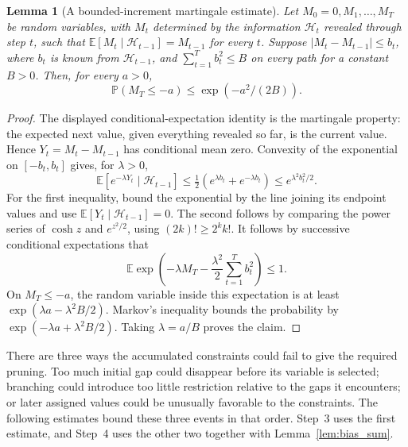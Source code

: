\documentclass[11pt,a4paper]{article}
\newtheorem{lemma}[theorem]{Lemma}
\theoremstyle{definition}
\theoremstyle{remark}
\newcommand{\E}{\mathbb E}
\newcommand{\Prb}{\mathbb P}
\begin{document}
\begin{lemma}[A bounded-increment martingale estimate]\label{lem:martingale_tail}
Let $M_0=0,M_1,\ldots,M_T$ be random variables, with $M_t$ determined
by the information $\mathcal H_t$ revealed through step $t$, such that
$\E[M_t\mid\mathcal H_{t-1}]=M_{t-1}$ for every $t$.
Suppose $|M_t-M_{t-1}|\le b_t$, where $b_t$ is known from
$\mathcal H_{t-1}$, and $\sum_{t=1}^T b_t^2\le B$ on every path for a
constant $B>0$. Then, for every $a>0$,
\[
 \Prb(M_T\le-a)\le\exp(-a^2/(2B)).
\]
\end{lemma}
\begin{proof}
The displayed conditional-expectation identity is the martingale property:
the expected next value, given everything revealed so far, is the current
value. Hence $Y_t=M_t-M_{t-1}$ has conditional mean zero.
Convexity of the exponential on $[-b_t,b_t]$ gives, for $\lambda>0$,
\[
 \E[e^{-\lambda Y_t}\mid\mathcal H_{t-1}]
 \le\tfrac12(e^{\lambda b_t}+e^{-\lambda b_t})
 \le e^{\lambda^2b_t^2/2}.
\]
For the first inequality, bound the exponential by the line joining its
endpoint values and use $\E[Y_t\mid\mathcal H_{t-1}]=0$.
The second follows by comparing the power series of $\cosh z$ and
$e^{z^2/2}$, using $(2k)!\ge2^k k!$.
It follows by successive conditional expectations that
\[
 \E\exp\left(-\lambda M_T-
                 \frac{\lambda^2}{2}\sum_{t=1}^T b_t^2\right)\le1.
\]
On $M_T\le-a$, the random variable inside this expectation is at least
$\exp(\lambda a-\lambda^2B/2)$. Markov's inequality bounds the probability
by $\exp(-\lambda a+\lambda^2B/2)$. Taking $\lambda=a/B$ proves the claim.
\end{proof}

There are three ways the accumulated constraints could fail to give the
required pruning. Too much initial gap could disappear before its variable
is selected; branching could introduce too little restriction relative
to the gaps it encounters; or later assigned values could be unusually
favorable to the constraints. The following estimates bound these three
events in that order. Step~3 uses the first estimate, and Step~4 uses the
other two together with Lemma~\ref{lem:bias_sum}.
\end{document}

